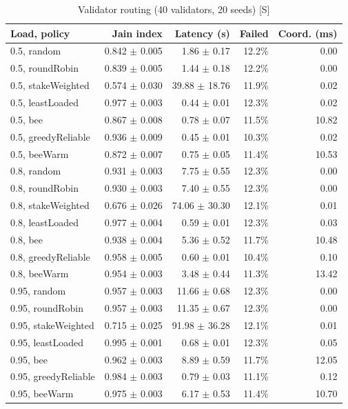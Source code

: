 \begin{table}[t]
\centering
\caption{Validator routing (40 validators, 20 seeds) [S]}
\label{tab:bee}
\begin{tabular}{lrrrr}
\toprule
Load, policy & Jain index & Latency (s) & Failed & Coord. (ms) \\
\midrule
0.5, random & 0.842 $\pm$ 0.005 & 1.86 $\pm$ 0.17 & 12.2\% & 0.00 \\
0.5, roundRobin & 0.839 $\pm$ 0.005 & 1.44 $\pm$ 0.18 & 12.2\% & 0.00 \\
0.5, stakeWeighted & 0.574 $\pm$ 0.030 & 39.88 $\pm$ 18.76 & 11.9\% & 0.02 \\
0.5, leastLoaded & 0.977 $\pm$ 0.003 & 0.44 $\pm$ 0.01 & 12.3\% & 0.02 \\
0.5, bee & 0.867 $\pm$ 0.008 & 0.78 $\pm$ 0.07 & 11.5\% & 10.82 \\
0.5, greedyReliable & 0.936 $\pm$ 0.009 & 0.45 $\pm$ 0.01 & 10.3\% & 0.02 \\
0.5, beeWarm & 0.872 $\pm$ 0.007 & 0.75 $\pm$ 0.05 & 11.4\% & 10.53 \\
0.8, random & 0.931 $\pm$ 0.003 & 7.75 $\pm$ 0.55 & 12.3\% & 0.00 \\
0.8, roundRobin & 0.930 $\pm$ 0.003 & 7.40 $\pm$ 0.55 & 12.3\% & 0.00 \\
0.8, stakeWeighted & 0.676 $\pm$ 0.026 & 74.06 $\pm$ 30.30 & 12.1\% & 0.01 \\
0.8, leastLoaded & 0.977 $\pm$ 0.004 & 0.59 $\pm$ 0.01 & 12.3\% & 0.03 \\
0.8, bee & 0.938 $\pm$ 0.004 & 5.36 $\pm$ 0.52 & 11.7\% & 10.48 \\
0.8, greedyReliable & 0.958 $\pm$ 0.005 & 0.60 $\pm$ 0.01 & 10.4\% & 0.10 \\
0.8, beeWarm & 0.954 $\pm$ 0.003 & 3.48 $\pm$ 0.44 & 11.3\% & 13.42 \\
0.95, random & 0.957 $\pm$ 0.003 & 11.66 $\pm$ 0.68 & 12.3\% & 0.00 \\
0.95, roundRobin & 0.957 $\pm$ 0.003 & 11.35 $\pm$ 0.67 & 12.3\% & 0.00 \\
0.95, stakeWeighted & 0.715 $\pm$ 0.025 & 91.98 $\pm$ 36.28 & 12.1\% & 0.01 \\
0.95, leastLoaded & 0.995 $\pm$ 0.001 & 0.68 $\pm$ 0.01 & 12.3\% & 0.05 \\
0.95, bee & 0.962 $\pm$ 0.003 & 8.89 $\pm$ 0.59 & 11.7\% & 12.05 \\
0.95, greedyReliable & 0.984 $\pm$ 0.003 & 0.79 $\pm$ 0.03 & 11.1\% & 0.12 \\
0.95, beeWarm & 0.975 $\pm$ 0.003 & 6.17 $\pm$ 0.53 & 11.4\% & 10.70 \\
\bottomrule
\end{tabular}
\end{table}

